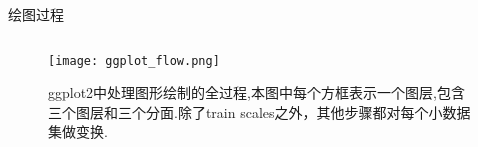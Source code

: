 \begin{frame}{\subsecname}{绘图过程}
\begin{figure}[ht]
  \begin{columns}
    \begin{column}{.6\textwidth}\centering
  \texttt{[image: ggplot\_flow.png]}
    \end{column}

    \begin{column}[c]{.4\textwidth}
  \caption{ggplot2中处理图形绘制的全过程,本图中每个方框表示一个图层,包含三个图层和三个分面.除了train scales之外，其他步骤都对每个小数据集做变换.}
    \end{column}
  \end{columns}
\end{figure}
\end{frame}

